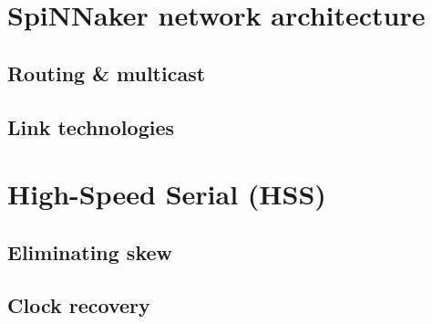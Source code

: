 	
	\section{SpiNNaker network architecture}
		\label{sec:spinnaker}
		
		
		\subsection{Routing \& multicast}
			
		
		\subsection{Link technologies}
			
	
	\section{High-Speed Serial (HSS)}
		\label{sec:high-speed-serial}
		
		
		\subsection{Eliminating skew}
			
		
		\subsection{Clock recovery}
			
		
